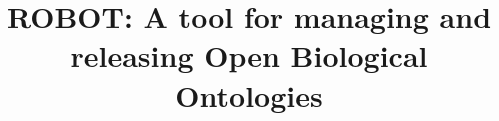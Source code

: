 \documentclass{bmcart}
\begin{document}
\begin{frontmatter}

\begin{fmbox}


\title{ROBOT: A tool for managing and releasing Open Biological Ontologies}


\author[
   addressref={knocean},                   %
   email={rctauber@gmail.com}   %
]{ }

\author[
   addressref={rti},                   %
   email={balhoff@renci.org}   %
]{ }


\author[
   addressref={lbl},                   %
   email={edouglass@lbl.gov}   %
]{ }

\author[
   addressref={ebi},                   %
   email={davidos@ebi.ac.uk}   %
]{ }

\author[
   addressref={lbl},
   email={cjmungall@lbl.gov}
]{ }


\author[
   addressref={knocean},                   %
   email={james@overton.ca}   %
]{ }


\end{fmbox}
\end{frontmatter}
\end{document}
